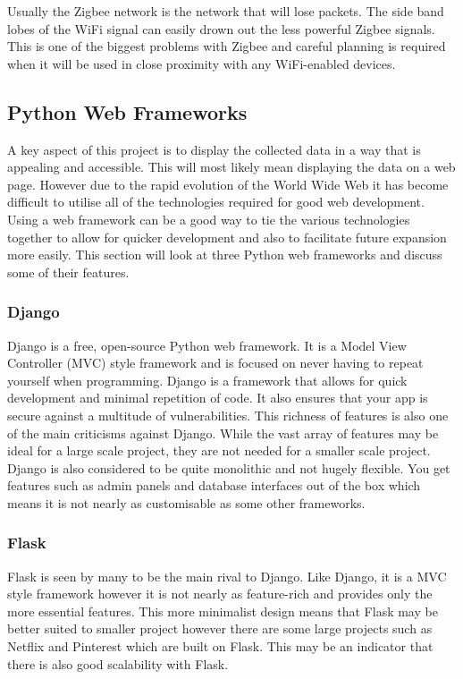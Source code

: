 \documentclass[10pt,a4paper]{article}
\begin{document}
Usually the Zigbee network is the network that will lose packets. The side band lobes of the WiFi signal can easily drown out the less powerful Zigbee signals. This is one of the biggest problems with Zigbee and careful planning is required when it will be used in close proximity with any WiFi-enabled devices.

\subsection{Python Web Frameworks}
A key aspect of this project is to display the collected data in a way that is appealing and accessible. This will most likely mean displaying the data on a web page. However due to the rapid evolution of the World Wide Web it has become difficult to utilise all of the technologies required for good web development\cite{pop_altar_2014}. Using a web framework can be a good way to tie the various technologies together to allow for quicker development and also to facilitate future expansion more easily. This section will look at three Python web frameworks and discuss some of their features. 
\subsubsection{Django}
Django\cite{website:django} is a free, open-source Python web framework. It is a Model View Controller (MVC) style framework and is focused on never having to repeat yourself when programming. Django is a framework that allows for quick development and minimal repetition of code. It also ensures that your app is secure against a multitude of vulnerabilities. This richness of features is also one of the main criticisms against Django. While the vast array of features may be ideal for a large scale project, they are not needed for a smaller scale project. Django is also considered to be quite monolithic and not hugely flexible. You get features such as admin panels and database interfaces out of the box which means it is not nearly as customisable as some other frameworks. 
\subsubsection{Flask}
Flask\cite{website:flask} is seen by many to be the main rival to Django. Like Django, it is a MVC style framework however it is not nearly as feature-rich and provides only the more essential features. This more minimalist design means that Flask may be better suited to smaller project however there are some large projects such as Netflix and Pinterest which are built on Flask. This may be an indicator that there is also good scalability with Flask. 
\end{document}
